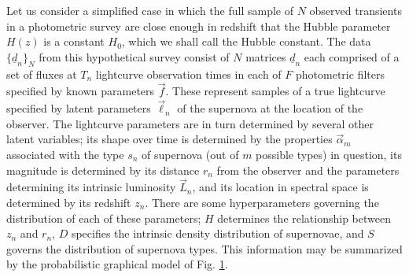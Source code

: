 \documentclass[12pt, onecolumn]{emulateapj}
\newcommand{\textul}{\underline}
\begin{document}
Let us consider a simplified case in which the full sample of $N$ observed transients in a photometric survey are close enough in redshift that the Hubble parameter $H(z)$ is a constant $H_{0}$, which we shall call the Hubble constant.  The data $\{\textul{d}_{n}\}_{N}$ from this hypothetical survey consist of $N$ matrices $\textul{d}_{n}$ each comprised of a set of fluxes at $T_{n}$ lightcurve observation times in each of $F$ photometric filters specified by known parameters $\vec{f}$.  These represent samples of a true lightcurve specified by latent parameters $\vec{\ell}_{n}$ of the supernova at the location of the observer.  The lightcurve parameters are in turn determined by several other latent variables; its shape over time is determined by the properties $\vec{\alpha}_{m}$ associated with the type $s_{n}$ of supernova (out of $m$ possible types) in question, its magnitude is determined by its distance $r_{n}$ from the observer and the parameters determining its intrinsic luminosity $\vec{L}_{n}$, and its location in spectral space is determined by its redshift $z_{n}$.  There are some hyperparameters governing the distribution of each of these parameters; $H$ determines the relationship between $z_{n}$ and $r_{n}$, $D$ specifies the intrinsic density distribution of supernovae, and $S$ governs the distribution of supernova types.  This information may be summarized by the probabilistic graphical model of Fig. \ref{fig:pgm}.

\begin{figure}
\vspace{0.5cm}
\begin{center}
\caption{}
\label{fig:pgm}
\end{center}
\end{figure}
\end{document}
